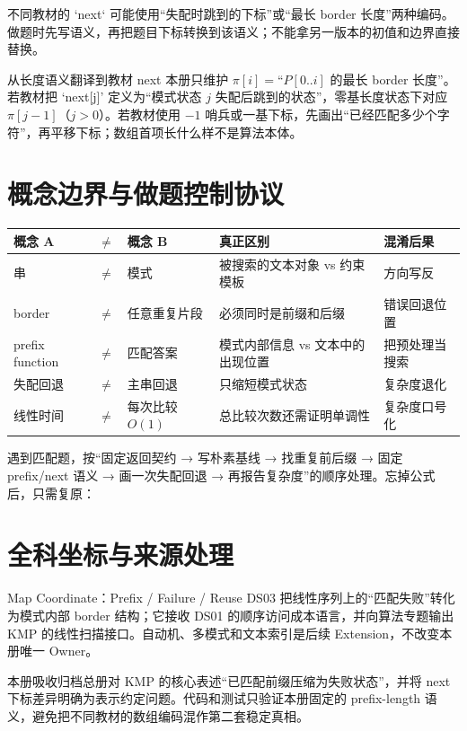 \documentclass[UTF8,fontset=none,11pt,a4paper]{ctexart}
\begin{document}
不同教材的 `next` 可能使用“失配时跳到的下标”或“最长 border 长度”两种编码。做题时先写语义，再把题目下标转换到该语义；不能拿另一版本的初值和边界直接替换。

\begin{methodbox}{从长度语义翻译到教材 next}
本册只维护 $\pi[i]=$“$P[0..i]$ 的最长 border 长度”。若教材把 `next[j]' 定义为“模式状态 $j$ 失配后跳到的状态”，零基长度状态下对应 $\pi[j-1]$（$j>0$）。若教材使用 $-1$ 哨兵或一基下标，先画出“已经匹配多少个字符”，再平移下标；数组首项长什么样不是算法本体。
\end{methodbox}

\section{概念边界与做题控制协议}
\begin{center}\small
\begin{tabularx}{\linewidth}{L{1.9cm}C{0.35cm}L{1.9cm}YY}
\toprule
概念 A & $\neq$ & 概念 B & 真正区别 & 混淆后果\\
\midrule
串 & $\neq$ & 模式 & 被搜索的文本对象 vs 约束模板 & 方向写反\\
border & $\neq$ & 任意重复片段 & 必须同时是前缀和后缀 & 错误回退位置\\
prefix function & $\neq$ & 匹配答案 & 模式内部信息 vs 文本中的出现位置 & 把预处理当搜索\\
失配回退 & $\neq$ & 主串回退 & 只缩短模式状态 & 复杂度退化\\
线性时间 & $\neq$ & 每次比较 $O(1)$ & 总比较次数还需证明单调性 & 复杂度口号化\\
\bottomrule
\end{tabularx}
\end{center}

遇到匹配题，按“固定返回契约 → 写朴素基线 → 找重复前后缀 → 固定 prefix/next 语义 → 画一次失配回退 → 再报告复杂度”的顺序处理。忘掉公式后，只需复原：

\section{全科坐标与来源处理}
\begin{corebox}{Map Coordinate：Prefix / Failure / Reuse}
DS03 把线性序列上的“匹配失败”转化为模式内部 border 结构；它接收 DS01 的顺序访问成本语言，并向算法专题输出 KMP 的线性扫描接口。自动机、多模式和文本索引是后续 Extension，不改变本册唯一 Owner。
\end{corebox}

本册吸收归档总册对 KMP 的核心表述“已匹配前缀压缩为失败状态”，并将 next 下标差异明确为表示约定问题。代码和测试只验证本册固定的 prefix-length 语义，避免把不同教材的数组编码混作第二套稳定真相。
\end{document}
